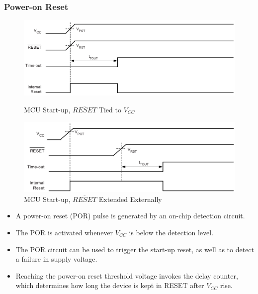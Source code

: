 \documentclass{article}
\begin{document}
\subsubsection{Power-on Reset}
\begin{figure}[H]
    \begin{minipage}{0.45\textwidth}
        \begin{center}
            \includegraphics[width=1\textwidth]{POR1.png}
            \caption*{MCU Start-up, $\overline{RESET}$ Tied to $V_{CC}$}
        \end{center}
    \end{minipage}
    \begin{minipage}{0.5\textwidth}
        \begin{center}
            \includegraphics[width=1\textwidth]{POR2.png}
            \caption*{MCU Start-up, $\overline{RESET}$ Extended Externally}
        \end{center}
    \end{minipage}
\end{figure}
\begin{itemize}
    \item A power-on reset (POR) pulse is generated by an on-chip detection circuit.
    \item The POR is activated whenever $V_{CC}$ is below the detection level.
    \item The POR circuit can be used to trigger the start-up reset, as well as to detect a failure in supply voltage.
    \item Reaching the power-on reset threshold voltage invokes the delay counter, which determines how long the device is kept in RESET after $V_{CC}$ rise.
\end{itemize}
\end{document}
